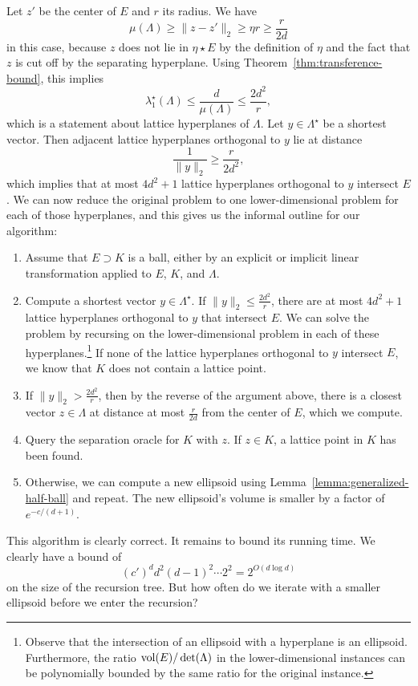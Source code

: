 Let $z'$ be the center of $E$ and $r$ its radius.
We have
\[
  \mu(\Lambda) \geq \|z - z'\|_2 \geq \eta r \geq \frac{r}{2d}
\]
in this case, because $z$ does not lie in $\eta \star E$ by the definition of $\eta$
and the fact that $z$ is cut off by the separating hyperplane.
Using Theorem~\ref{thm:transference-bound},
this implies
\[
  \lambda_1^\star(\Lambda) \leq \frac{d}{\mu(\Lambda)} \leq \frac{2d^2}{r},
\]
which is a statement about lattice hyperplanes of $\Lambda$.
Let $y \in \Lambda^\star$ be a shortest vector.
Then adjacent lattice hyperplanes orthogonal to $y$ lie at distance
\[
  \frac{1}{\|y\|_2} \geq \frac{r}{2d^2},
\]
which implies that at most $4d^2 + 1$ lattice hyperplanes orthogonal to $y$ intersect $E$.
We can now reduce the original problem to one lower-dimensional problem for each of those hyperplanes,
and this gives us the informal outline for our algorithm:
\begin{enumerate}
  \item Assume that $E \supset K$ is a ball, either by an explicit or implicit linear transformation applied
    to $E$, $K$, and $\Lambda$.

  \item Compute a shortest vector $y \in \Lambda^\star$.
    If $\|y\|_2 \leq \frac{2d^2}{r}$,
    there are at most $4d^2 + 1$ lattice hyperplanes orthogonal to $y$
    that intersect $E$.
    We can solve the problem by recursing on the lower-dimensional problem
    in each of these hyperplanes.\footnote{%
Observe that the intersection of an ellipsoid with a hyperplane is an ellipsoid.
Furthermore, the ratio $\operatorname{vol}(E)/\det(\Lambda)$ in the lower-dimensional instances can be polynomially bounded
by the same ratio for the original instance.}
    If none of the lattice hyperplanes orthogonal to $y$ intersect $E$,
    we know that $K$ does not contain a lattice point.

  \item If $\|y\|_2 > \frac{2d^2}{r}$,
    then by the reverse of the argument above,
    there is a closest vector $z \in \Lambda$ at distance at most $\frac{r}{2d}$
    from the center of $E$, which we compute.

  \item Query the separation oracle for $K$ with $z$.
    If $z \in K$, a lattice point in $K$ has been found.

  \item Otherwise,
    we can compute a new ellipsoid using Lemma~\ref{lemma:generalized-half-ball} and repeat.
    The new ellipsoid's volume is smaller by a factor of $e^{-c/(d+1)}$.
\end{enumerate}
This algorithm is clearly correct.
It remains to bound its running time.
We clearly have a bound of
\[
  (c')^d d^2 (d-1)^2 \cdots 2^2 = 2^{O(d \log d)}
\]
on the size of the recursion tree.
But how often do we iterate with a smaller ellipsoid before we enter the recursion?

